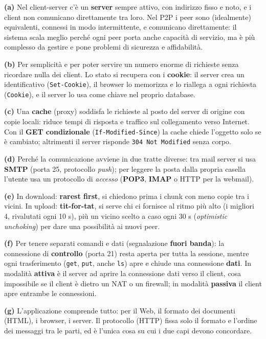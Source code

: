 \svolgimento
\textbf{(a)} Nel client-server c'è un \textbf{server} sempre attivo, con indirizzo fisso e noto, e i client non comunicano direttamente tra
loro. Nel P2P i peer sono (idealmente) equivalenti, connessi in modo intermittente, e comunicano direttamente: il sistema scala meglio
perché ogni peer porta anche capacità di servizio, ma è più complesso da gestire e pone problemi di sicurezza e affidabilità.

\textbf{(b)} Per semplicità e per poter servire un numero enorme di richieste senza ricordare nulla dei client. Lo stato si recupera con i
\textbf{cookie}: il server crea un identificativo (\texttt{Set-Cookie}), il browser lo memorizza e lo riallega a ogni richiesta
(\texttt{Cookie}), e il server lo usa come chiave nel proprio database.

\textbf{(c)} Una \textbf{cache} (proxy) soddisfa le richieste al posto del server di origine con copie locali: riduce tempi di risposta e
traffico sul collegamento verso Internet. Con il \textbf{GET condizionale} (\texttt{If-Modified-Since}) la cache chiede l'oggetto solo se
è cambiato; altrimenti il server risponde \texttt{304 Not Modified} senza corpo.

\textbf{(d)} Perché la comunicazione avviene in due tratte diverse: tra mail server si usa \textbf{SMTP} (porta 25, protocollo \emph{push});
per leggere la posta dalla propria casella l'utente usa un protocollo di \emph{accesso} (\textbf{POP3}, \textbf{IMAP} o HTTP per la webmail).

\textbf{(e)} In download: \textbf{rarest first}, si chiedono prima i chunk con meno copie tra i vicini. In upload: \textbf{tit-for-tat}, si
serve chi ci fornisce al ritmo più alto (i migliori 4, rivalutati ogni 10 s), più un vicino scelto a caso ogni 30 s
(\emph{optimistic unchoking}) per dare una possibilità ai nuovi peer.

\textbf{(f)} Per tenere separati comandi e dati (segnalazione \textbf{fuori banda}): la connessione di \textbf{controllo} (porta 21)
resta aperta per tutta la sessione, mentre ogni trasferimento (\texttt{get}, \texttt{put}, anche \texttt{ls}) apre e chiude una
connessione \textbf{dati}. In modalità \textbf{attiva} è il server ad aprire la connessione dati verso il client, cosa impossibile se il
client è dietro un NAT o un firewall; in modalità \textbf{passiva} il client apre entrambe le connessioni.

\textbf{(g)} L'applicazione comprende tutto: per il Web, il formato dei documenti (HTML), i browser, i server. Il protocollo (HTTP)
fissa solo il formato e l'ordine dei messaggi tra le parti, ed è l'unica cosa su cui i due capi devono concordare.

